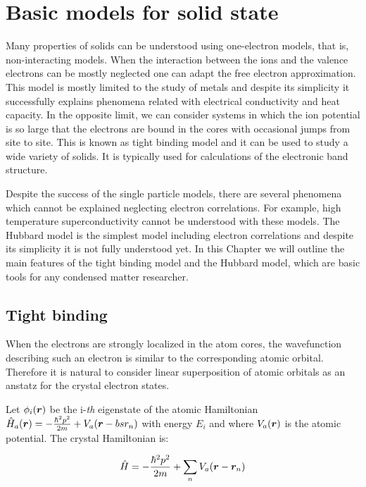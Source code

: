\chapter{Basic models for solid state}
\label{ChapBasicModels}

Many properties of solids can be understood using one-electron models, that is, non-interacting models. When the interaction between the ions and the valence electrons can be mostly neglected one can adapt the free electron approximation. This model is mostly limited to the study of metals and despite its simplicity it successfully explains phenomena related with electrical conductivity and heat capacity. In the opposite limit, we can consider systems in which the ion potential is so large that the electrons are bound in the cores with occasional jumps from site to site. This is known as tight binding model and it can be used to study a wide variety of solids. It is typically used for calculations of the electronic band structure.

Despite the success of the single particle models, there are several phenomena which cannot be explained neglecting electron correlations. For example, high temperature superconductivity cannot be understood with these models. The Hubbard model is the simplest model including electron correlations and despite its simplicity it is not fully understood yet. In this Chapter we will outline the main features of the tight binding model and the Hubbard model, which are basic tools for any condensed matter researcher.

\section{Tight binding}

When the electrons are strongly localized in the atom cores, the wavefunction describing such an electron is similar to the corresponding atomic orbital. Therefore it is natural to consider linear superposition of atomic orbitals as an anstatz for the crystal electron states.

Let $\phi_i(\boldsymbol{r})$ be the i-\textit{th} eigenstate of the atomic Hamiltonian $\hat{H}_a(\boldsymbol{r}) = -\frac{\hbar^2p^2}{2m} + V_a(\boldsymbol{r}-bs{r}_n)$ with energy $E_i$ and where $V_a(\boldsymbol{r})$ is the atomic potential. The crystal Hamiltonian is:

\begin{equation}
\label{CrystalHam}
\hat{H} = -\frac{\hbar^2p^2}{2m} + \sum_n V_a(\boldsymbol{r}-\boldsymbol{r}_n)
\end{equation}

